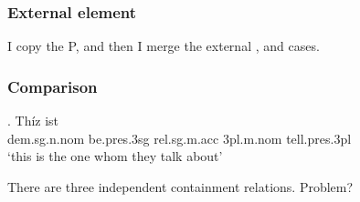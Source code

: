 \subsubsection{External element}

I copy the P, and then I merge the external ,  and cases.

\subsubsection{Comparison}

\exg. Thíz ist   \\
\ac{dem}.\ac{sg}.\ac{n}.\ac{nom} be.\ac{pres}.3\ac{sg}\scsub{[nom]} \ac{rel}.\ac{sg}.\ac{m}.\ac{acc} 3\ac{pl}.\ac{m}.\ac{nom} tell.\ac{pres}.3\ac{pl}\scsub{[acc]}\\
`this is the one whom they talk about' \label{ex:ohg-nom-acc-rep}

There are three independent containment relations. Problem?

